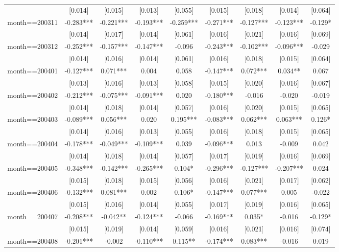 \documentclass[]{article}
\begin{document}
\begin{tabular}{lcccccccc}
 & [0.014] & [0.015] & [0.013] & [0.055] & [0.015] & [0.018] & [0.014] & [0.064] \\
month==200311 & -0.283*** & -0.221*** & -0.193*** & -0.259*** & -0.271*** & -0.127*** & -0.123*** & -0.129* \\
 & [0.014] & [0.017] & [0.014] & [0.061] & [0.016] & [0.021] & [0.016] & [0.069] \\
month==200312 & -0.252*** & -0.157*** & -0.147*** & -0.096 & -0.243*** & -0.102*** & -0.096*** & -0.029 \\
 & [0.014] & [0.016] & [0.014] & [0.061] & [0.016] & [0.018] & [0.015] & [0.064] \\
month==200401 & -0.127*** & 0.071*** & 0.004 & 0.058 & -0.147*** & 0.072*** & 0.034** & 0.067 \\
 & [0.013] & [0.016] & [0.013] & [0.058] & [0.015] & [0.020] & [0.016] & [0.067] \\
month==200402 & -0.212*** & -0.075*** & -0.091*** & 0.020 & -0.180*** & -0.016 & -0.020 & -0.019 \\
 & [0.014] & [0.018] & [0.014] & [0.057] & [0.016] & [0.020] & [0.015] & [0.065] \\
month==200403 & -0.089*** & 0.056*** & 0.020 & 0.195*** & -0.083*** & 0.062*** & 0.063*** & 0.126* \\
 & [0.014] & [0.016] & [0.013] & [0.055] & [0.016] & [0.018] & [0.015] & [0.065] \\
month==200404 & -0.178*** & -0.049*** & -0.109*** & 0.039 & -0.096*** & 0.013 & -0.009 & 0.042 \\
 & [0.014] & [0.018] & [0.014] & [0.057] & [0.017] & [0.019] & [0.016] & [0.069] \\
month==200405 & -0.348*** & -0.142*** & -0.265*** & 0.104* & -0.296*** & -0.127*** & -0.207*** & 0.024 \\
 & [0.015] & [0.018] & [0.015] & [0.056] & [0.016] & [0.021] & [0.017] & [0.062] \\
month==200406 & -0.132*** & 0.081*** & 0.002 & 0.106* & -0.147*** & 0.077*** & 0.005 & -0.022 \\
 & [0.015] & [0.016] & [0.014] & [0.055] & [0.017] & [0.019] & [0.016] & [0.065] \\
month==200407 & -0.208*** & -0.042** & -0.124*** & -0.066 & -0.169*** & 0.035* & -0.016 & -0.129* \\
 & [0.015] & [0.019] & [0.014] & [0.059] & [0.016] & [0.021] & [0.016] & [0.074] \\
month==200408 & -0.201*** & -0.002 & -0.110*** & 0.115** & -0.174*** & 0.083*** & -0.016 & 0.019 \\

\end{tabular}
\end{document}
